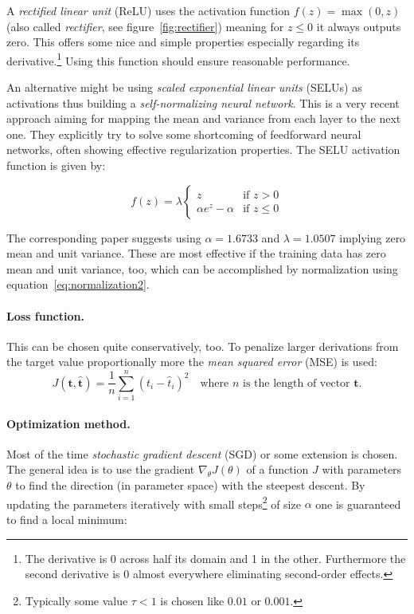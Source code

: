 A \emph{rectified linear unit} (ReLU) uses the activation function $f(z)=\max(0,z)$ (also called \emph{rectifier}, see figure~\ref{fig:rectifier}) meaning for $z \leq 0$ it always outputs zero. This offers some nice and simple properties especially regarding its derivative.\footnote{%
	The derivative is 0 across half its domain and 1 in the other. Furthermore the second derivative is 0 almost everywhere eliminating second-order effects.}
Using this function should ensure reasonable performance.

An alternative might be using \emph{scaled exponential linear units} (SELUs) as activations thus building a \emph{self-normalizing neural network}.\cite{DBLP:journals/corr/KlambauerUMH17} This is a very recent approach aiming for mapping the mean and variance from each layer to the next one. They explicitly try to solve some shortcoming of feedforward neural networks, often showing effective regularization properties. The SELU activation function is given by:

\begin{equation}
	\label{eq:selu}
	f(z) = \lambda
	\begin{cases}
	z & \text{if } z > 0 \\
	\alpha e^z - \alpha & \text{if } z \leq 0
	\end{cases}
\end{equation}

The corresponding paper suggests using $\alpha = 1.6733$ and $\lambda = 1.0507$ implying zero mean and unit variance. These are most effective if the training data has zero mean and unit variance, too, which can be accomplished by normalization using equation~\eqref{eq:normalization2}.

\paragraph{Loss function.}
This can be chosen quite conservatively, too. To penalize larger derivations from the target value proportionally more the \emph{mean squared error} (MSE) is used:
\begin{equation}
	\label{eq:mse}
	J(\mathbf{t}, \mathbf{\hat{t}}) =
	\frac{1}{n} \sum_{i=1}^{n}(t_i - \hat{t}_i)^2 \quad
	\text{where } n \text{ is the length of vector } \mathbf{t}.
\end{equation}

\paragraph{Optimization method.}
Most of the time \emph{stochastic gradient descent} (SGD) or some extension is chosen. The general idea is to use the gradient $\nabla_{\theta}J(\theta)$ of a function $J$ with parameters $\theta$ to find the direction (in parameter space) with the steepest descent. By updating the parameters iteratively with small steps\footnote{%
	Typically some value $\tau < 1$ is chosen like $0.01$ or $0.001$.}
of size $\alpha$ one is guaranteed to find a local minimum:

